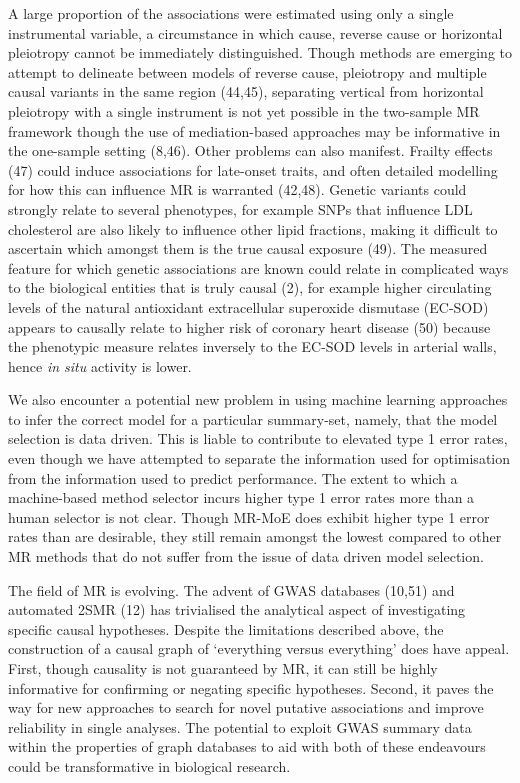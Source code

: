 \documentclass[]{article}
\begin{document}
A large proportion of the associations were estimated using only a
single instrumental variable, a circumstance in which cause, reverse
cause or horizontal pleiotropy cannot be immediately distinguished.
Though methods are emerging to attempt to delineate between models of
reverse cause, pleiotropy and multiple causal variants in the same
region (44,45), separating vertical from horizontal pleiotropy with a
single instrument is not yet possible in the two-sample MR framework
though the use of mediation-based approaches may be informative in the
one-sample setting (8,46). Other problems can also manifest. Frailty
effects (47) could induce associations for late-onset traits, and often
detailed modelling for how this can influence MR is warranted (42,48).
Genetic variants could strongly relate to several phenotypes, for
example SNPs that influence LDL cholesterol are also likely to influence
other lipid fractions, making it difficult to ascertain which amongst
them is the true causal exposure (49). The measured feature for which
genetic associations are known could relate in complicated ways to the
biological entities that is truly causal (2), for example higher
circulating levels of the natural antioxidant extracellular superoxide
dismutase (EC-SOD) appears to causally relate to higher risk of coronary
heart disease (50) because the phenotypic measure relates inversely to
the EC-SOD levels in arterial walls, hence \emph{in situ} activity is
lower.

We also encounter a potential new problem in using machine learning
approaches to infer the correct model for a particular summary-set,
namely, that the model selection is data driven. This is liable to
contribute to elevated type 1 error rates, even though we have attempted
to separate the information used for optimisation from the information
used to predict performance. The extent to which a machine-based method
selector incurs higher type 1 error rates more than a human selector is
not clear. Though MR-MoE does exhibit higher type 1 error rates than are
desirable, they still remain amongst the lowest compared to other MR
methods that do not suffer from the issue of data driven model
selection.

The field of MR is evolving. The advent of GWAS databases (10,51) and
automated 2SMR (12) has trivialised the analytical aspect of
investigating specific causal hypotheses. Despite the limitations
described above, the construction of a causal graph of `everything
versus everything' does have appeal. First, though causality is not
guaranteed by MR, it can still be highly informative for confirming or
negating specific hypotheses. Second, it paves the way for new
approaches to search for novel putative associations and improve
reliability in single analyses. The potential to exploit GWAS summary
data within the properties of graph databases to aid with both of these
endeavours could be transformative in biological research.
\end{document}
